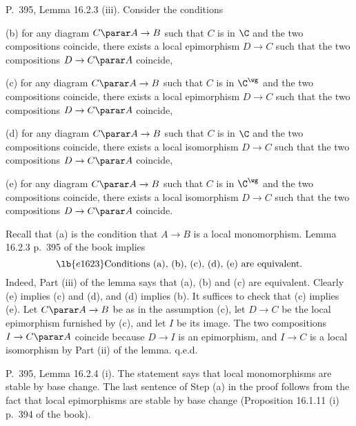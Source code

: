 \documentclass[12pt]{article}
\theoremstyle{remark}
\theoremstyle{definition}
\begin{document}
\begin{s}
P.~395, Lemma 16.2.3 (iii). Consider the conditions

\nn(b) for any diagram $C\parar A\to B$ such that $C$ is in $\C$ and the two compositions coincide, there exists a local epimorphism $D\to C$ such that the two compositions $D\to C\parar A$ coincide,

\nn(c) for any diagram $C\parar A\to B$ such that $C$ is in $\C^\wg$ and the two compositions coincide, there exists a local epimorphism $D\to C$ such that the two compositions $D\to C\parar A$ coincide,

\nn(d) for any diagram $C\parar A\to B$ such that $C$ is in $\C$ and the two compositions coincide, there exists a local isomorphism $D\to C$ such that the two compositions $D\to C\parar A$ coincide,

\nn(e) for any diagram $C\parar A\to B$ such that $C$ is in $\C^\wg$ and the two compositions coincide, there exists a local isomorphism $D\to C$ such that the two compositions $D\to C\parar A$ coincide.

Recall that (a) is the condition that $A\to B$ is a local monomorphism. Lemma 16.2.3 p.~395 of the book implies 
\begin{equation}\lb{e1623}
\text{Conditions (a), (b), (c), (d), (e) are equivalent.}
\end{equation} 
Indeed, Part (iii) of the lemma says that (a), (b) and (c) are equivalent. Clearly (e) implies (c) and (d), and (d) implies (b). It suffices to check that (c) implies (e). Let $C\parar A\to B$ be as in the assumption (c), let $D\to C$ be the local epimorphism furnished by (c), and let $I$ be its image. The two compositions $I\to C\parar A$ coincide because $D\to I$ is an epimorphism, and $I\to C$ is a local isomorphism by Part (ii) of the lemma. q.e.d.
\end{s}

%

\begin{s} 
P.~395, Lemma 16.2.4 (i). The statement says that local monomorphisms are stable by base change. The last sentence of Step (a) in the proof follows from the fact that local epimorphisms are stable by base change (Proposition 16.1.11 (i) p.~394 of the book). 
\end{s}

%
\end{document}
